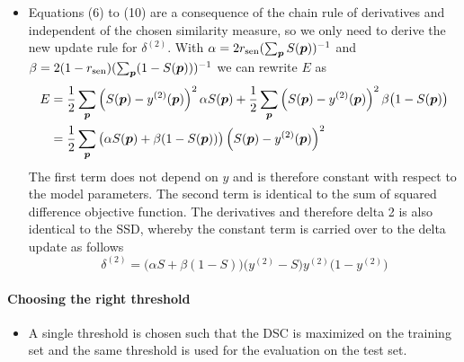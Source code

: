 \begin{itemize}
\item Equations (6) to (10) are a consequence of the chain rule of derivatives
and independent of the chosen similarity measure, so we only need to derive the
new update rule for $\delta^{(2)}$. With $\alpha = 2r_\text{sen}
(\sum_{\vect{p}}S(\vect{p}))^{-1}$ and $\beta = 2(1 -
r_\text{sen})(\sum_{\vect{p}}(1 - S(\vect{p})))^{-1}$ we can rewrite $E$ as
\begin{align} 
E &= \frac{1}{2}\sum_{\vect{p}} \left(S(\vect{p}) - y^{(2)}(\vect{p})\right)^2
\alpha S(\vect{p}) +
\frac{1}{2}\sum_{\vect{p}} \left(S(\vect{p}) - y^{(2)}(\vect{p})\right)^2
\beta\big(1 - S(\vect{p})\big) \\
 &= \frac{1}{2}\sum_{\vect{p}} \big(\alpha S(\vect{p}) +
 \beta(1 - S(\vect{p}))\big)
 \left(S(\vect{p}) - y^{(2)}(\vect{p})\right)^2
\end{align}
The first term does not depend on $y$ and is therefore constant with respect to
the model parameters. The second term is identical to the sum of squared
difference objective function. The derivatives and therefore delta 2 is
also identical to the SSD, whereby the constant term is carried over to the
delta update as follows
\begin{equation} 
\delta^{(2)} = \big(\alpha S + \beta (1 - S)\big)\big(y^{(2)} - S\big) y^{(2)}
\big(1 - y^{(2)}\big)
\end{equation}

\end{itemize}

\paragraph{Choosing the right threshold}

\begin{itemize}
\item A single threshold is chosen such that the DSC is maximized on the
training set and the same threshold is used for the evaluation on the test set.
\end{itemize}

